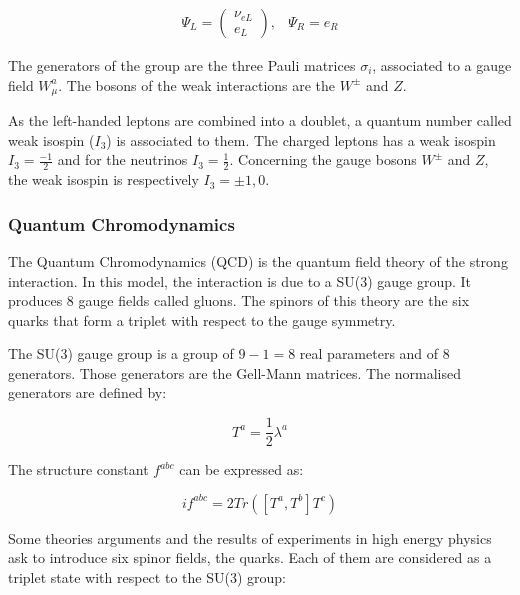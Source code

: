     \begin{equation}
      \begin{array}{cc}
        \Psi_L = 
         \begin{pmatrix}
           \nu_{eL} \\
           e_L
         \end{pmatrix}, & \Psi_R = e_R
      \end{array}
    \end{equation}

    The generators of the group are the three Pauli matrices $\sigma_i$, associated to a gauge field $W_{\mu}^a$.
    The bosons of the weak interactions are the $W^{\pm}$ and $Z$.

    As the left-handed leptons are combined into a doublet, a quantum number called weak isospin ($I_3$) is associated to them.
    The charged leptons has a weak isospin $I_3 = \frac{-1}{2}$ and for the neutrinos $I_3 = \frac{1}{2}$.
    Concerning the gauge bosons $W^{\pm}$ and $Z$, the weak isospin is respectively $I_3 = \pm 1, 0$.
    
    \subsubsection{Quantum Chromodynamics}
    
    The Quantum Chromodynamics (QCD) is the quantum field theory of the strong interaction.
    In this model, the interaction is due to a SU(3) gauge group. 
    It produces 8 gauge fields called gluons.
    The spinors of this theory are the six quarks that form a triplet with respect to the gauge symmetry.

    The SU(3) gauge group is a group of $9 - 1 = 8$ real parameters and of 8 generators. 
    Those generators are the Gell-Mann matrices. 
    The normalised generators are defined by: 
    
    \begin{equation}
        T^a = \frac{1}{2}\lambda^a
    \end{equation}

    The structure constant $f^{abc}$ can be expressed as:

    \begin{equation}
        if^{abc} = 2 Tr([T^a,T^b]T^c)
    \end{equation}
     
    Some theories arguments and the results of experiments in high energy physics ask to introduce six spinor fields, the quarks.
    Each of them are considered as a triplet state with respect to the SU(3) group:

